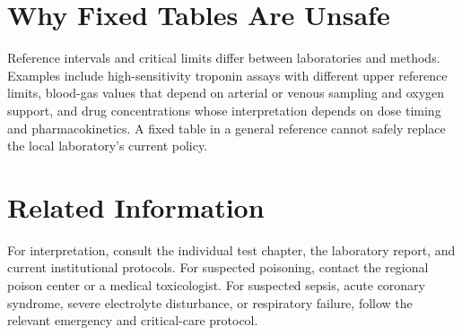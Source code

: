 \section{Why Fixed Tables Are Unsafe}

Reference intervals and critical limits differ between laboratories and methods. Examples include high-sensitivity troponin assays with different upper reference limits, blood-gas values that depend on arterial or venous sampling and oxygen support, and drug concentrations whose interpretation depends on dose timing and pharmacokinetics. A fixed table in a general reference cannot safely replace the local laboratory's current policy.

\section{Related Information}

For interpretation, consult the individual test chapter, the laboratory report, and current institutional protocols. For suspected poisoning, contact the regional poison center or a medical toxicologist. For suspected sepsis, acute coronary syndrome, severe electrolyte disturbance, or respiratory failure, follow the relevant emergency and critical-care protocol.

\clearpage
